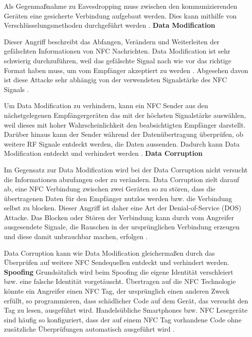 Als Gegenmaßnahme zu Eavesdropping muss zwischen den kommunizierenden Geräten eine gesicherte Verbindung aufgebaut werden. Dies kann mithilfe von Verschlüsselungsmethoden durchgeführt werden \cite{nfcTechVulnAttack}. 
\newline
\newline
\textbf{Data Modification}

Dieser Angriff beschreibt das Abfangen, Verändern und Weiterleiten der gefälschten Informationen von NFC Nachrichten. Data Modification ist sehr schwierig durchzuführen, weil das gefälschte Signal nach wie vor das richtige Format haben muss, um vom Empfänger akzeptiert zu werden \cite{nfcTechVulnAttack}. Abgesehen davon ist diese Attacke sehr abhängig von der verwendeten Signalstärke des NFC Signals \cite{securityNfc}. 

Um Data Modification zu verhindern, kann ein NFC Sender aus den nächstgelegenen Empfängergeräten das mit der höchsten Signalstärke auswählen, weil dieses mit hoher Wahrscheinlichkeit den beabsichtigten Empfänger darstellt. Darüber hinaus kann der Sender während der Datenübertragung überprüfen, ob weitere RF Signale entdeckt werden, die Daten aussenden. Dadurch kann Data Modification entdeckt und verhindert werden \cite{nfcTechVulnAttack}.
\newline
\newline
\textbf{Data Corruption}

Im Gegensatz zur Data Modification wird bei der Data Corruption nicht versucht die Informationen abzufangen oder zu verändern. Data Corruption zielt darauf ab, eine NFC Verbindung zwischen zwei Geräten so zu stören, dass die übertragenen Daten für den Empfänger nutzlos werden bzw. die Verbindung selbst zu blocken. Dieser Angriff ist daher eine Art der Denial-of-Service (DOS) Attacke. Das Blocken oder Stören der Verbindung kann durch vom Angreifer ausgesendete Signale, die Rauschen in der ursprünglichen Verbindung erzeugen und diese damit unbrauchbar machen, erfolgen \cite{nfcTechVulnAttack}.

Data Corruption kann wie Data Modification gleichermaßen durch das Überprüfen auf weitere NFC Sendequellen entdeckt und verhindert werden. 
\newline
\newline
\textbf{Spoofing}
Grundsätzlich wird beim Spoofing die eigene Identität verschleiert bzw. eine falsche Identität vorgetäuscht. Übertragen auf die NFC Technologie könnte ein 
Angreifer einen NFC Tag, der ursprünglich einen anderen Zweck erfüllt, so programmieren, dass schädlicher Code auf dem Gerät, das versucht den Tag zu lesen, ausgeführt wird. Handelsübliche Smartphones bzw. NFC Lesegeräte sind häufig so konfiguriert, dass der auf einem NFC Tag vorhandene Code ohne zusätzliche Überprüfungen automatisch ausgeführt wird \cite{nfcTechVulnAttack}. 

